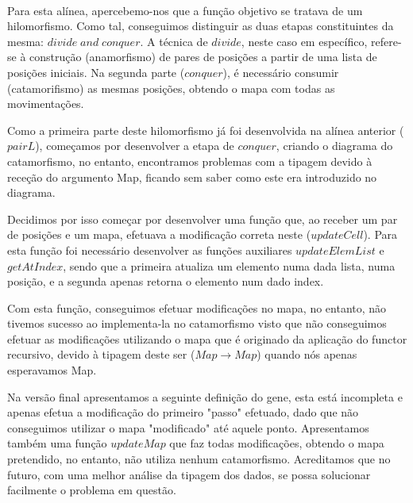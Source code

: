 \documentclass[a4paper]{article}
\newcommand{\Conid}[1]{\mathit{#1}}
\newcommand{\Varid}[1]{\mathit{#1}}
\begin{document}
\paragraph{}
Para esta alínea, apercebemo-nos que a função objetivo se tratava de um hilomorfismo. Como tal, conseguimos distinguir as duas etapas
constituintes da mesma: \ensuremath{\Varid{divide}\;\Varid{and}\;\Varid{conquer}}. A técnica de \ensuremath{\Varid{divide}}, neste caso em específico, refere-se à construção (anamorfismo) de pares de posições
a partir de uma lista de posições iniciais. Na segunda parte (\ensuremath{\Varid{conquer}}), é necessário consumir (catamorifismo) as mesmas posições, obtendo o mapa com todas 
as movimentações. 
\par
Como a primeira parte deste hilomorfismo já foi desenvolvida na alínea anterior (\ensuremath{\Varid{pairL}}), começamos por desenvolver a etapa de \ensuremath{\Varid{conquer}}, 
criando o diagrama do catamorfismo, no entanto, encontramos problemas com a tipagem devido à receção do argumento Map, ficando sem saber 
como este era introduzido no diagrama. 
\par
Decidimos por isso começar por desenvolver uma função que, ao receber um par de posições e um mapa, efetuava a modificação correta neste (\ensuremath{\Varid{updateCell}}). 
Para esta função foi necessário desenvolver as funções auxiliares \ensuremath{\Varid{updateElemList}} e \ensuremath{\Varid{getAtIndex}}, sendo que a primeira atualiza um elemento numa dada lista,
numa posição, e a segunda apenas retorna o elemento num dado index.
\par
Com esta função, conseguimos efetuar modificações no mapa, no entanto, não tivemos sucesso ao implementa-la no catamorfismo visto que não conseguimos efetuar
as modificações utilizando o mapa que é originado da aplicação do functor recursivo, devido à tipagem deste ser (\ensuremath{\Conid{Map}\to \Conid{Map}}) quando nós apenas esperavamos Map.
\par
Na versão final apresentamos a seguinte definição do gene, esta está incompleta e apenas efetua a modificação do primeiro "passo" efetuado, dado que não
conseguimos utilizar o mapa "modificado" até aquele ponto. Apresentamos também uma função \ensuremath{\Varid{updateMap}} que faz todas modificações, obtendo o mapa pretendido,
no entanto, não utiliza nenhum catamorfismo. Acreditamos que no futuro, com uma melhor análise da tipagem dos dados, se possa solucionar facilmente o problema em questão. 
\paragraph{}
\end{document}
